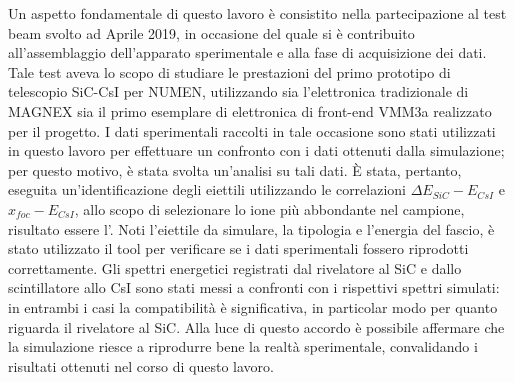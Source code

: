 Un aspetto fondamentale di questo lavoro è consistito nella partecipazione al test beam svolto ad Aprile 2019, in occasione del quale si è contribuito all'assemblaggio dell'apparato sperimentale e alla fase di acquisizione dei dati.
Tale test aveva lo scopo di studiare le prestazioni del primo prototipo di telescopio SiC-CsI per NUMEN, utilizzando sia l'elettronica tradizionale di MAGNEX sia il primo esemplare di elettronica di front-end VMM3a realizzato per il progetto.
I dati sperimentali raccolti in tale occasione sono stati utilizzati in questo lavoro per effettuare un confronto con i dati ottenuti dalla simulazione; per questo motivo, è stata svolta un'analisi su tali dati.
È stata, pertanto, eseguita un'identificazione degli eiettili utilizzando le correlazioni $\Delta E_{SiC} -E_{CsI}$ e $x_{foc} -E_{CsI}$, allo scopo di selezionare lo ione più abbondante nel campione, risultato essere l'.
Noti l'eiettile da simulare, la tipologia e l'energia del fascio, è stato utilizzato il tool per verificare se i dati sperimentali fossero riprodotti correttamente.
Gli spettri energetici registrati dal rivelatore al SiC e dallo scintillatore allo CsI sono stati messi a confronti con i rispettivi spettri simulati: in entrambi i casi la compatibilità è significativa, in particolar modo per quanto riguarda il rivelatore al SiC.
Alla luce di questo accordo è possibile affermare che la simulazione riesce a riprodurre bene la realtà sperimentale, convalidando i risultati ottenuti nel corso di questo lavoro.





